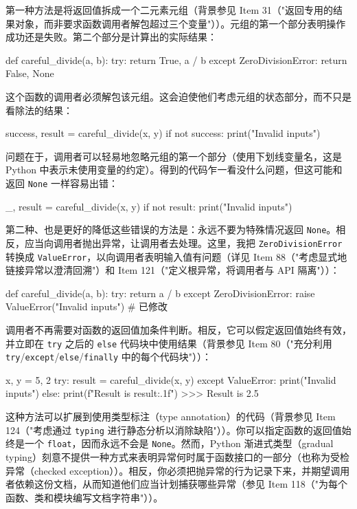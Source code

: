 第一种方法是将返回值拆成一个二元素元组（背景参见 Item 31（"返回专用的结果对象，而非要求函数调用者解包超过三个变量"））。元组的第一个部分表明操作成功还是失败。第二个部分是计算出的实际结果：

\begin{codebox}[python]
def careful_divide(a, b):
    try:
        return True, a / b
    except ZeroDivisionError:
        return False, None
\end{codebox}

这个函数的调用者必须解包该元组。这会迫使他们考虑元组的状态部分，而不只是看除法的结果：

\begin{codebox}[python]
success, result = careful_divide(x, y)
if not success:
    print("Invalid inputs")
\end{codebox}

问题在于，调用者可以轻易地忽略元组的第一个部分（使用下划线变量名，这是 Python 中表示未使用变量的约定）。得到的代码乍一看没什么问题，但这可能和返回 \texttt{None} 一样容易出错：

\begin{codebox}[python]
_, result = careful_divide(x, y)
if not result:
    print("Invalid inputs")
\end{codebox}

第二种、也是更好的降低这些错误的方法是：永远不要为特殊情况返回 \texttt{None}。相反，应当向调用者抛出异常，让调用者去处理。这里，我把 \texttt{ZeroDivisionError} 转换成 \texttt{ValueError}，以向调用者表明输入值有问题（详见 Item 88（"考虑显式地链接异常以澄清回溯"）和 Item 121（"定义根异常，将调用者与 API 隔离"））：

\begin{codebox}[python]
def careful_divide(a, b):
    try:
        return a / b
    except ZeroDivisionError:
        raise ValueError("Invalid inputs")  # 已修改
\end{codebox}

调用者不再需要对函数的返回值加条件判断。相反，它可以假定返回值始终有效，并立即在 \texttt{try} 之后的 \texttt{else} 代码块中使用结果（背景参见 Item 80（"充分利用 \texttt{try}/\texttt{except}/\texttt{else}/\texttt{finally} 中的每个代码块"））：

\begin{codebox}[python]
x, y = 5, 2
try:
    result = careful_divide(x, y)
except ValueError:
    print("Invalid inputs")
else:
    print(f"Result is {result:.1f}")
>>>
Result is 2.5
\end{codebox}

这种方法可以扩展到使用类型标注（type annotation）的代码（背景参见 Item 124（"考虑通过 \texttt{typing} 进行静态分析以消除缺陷"））。你可以指定函数的返回值始终是一个 \texttt{float}，因而永远不会是 \texttt{None}。然而，Python 渐进式类型（gradual typing）刻意不提供一种方式来表明异常何时属于函数接口的一部分（也称为受检异常（checked exception））。相反，你必须把抛异常的行为记录下来，并期望调用者依赖这份文档，从而知道他们应当计划捕获哪些异常（参见 Item 118（"为每个函数、类和模块编写文档字符串"））。

